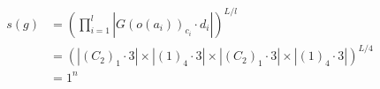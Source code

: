 \documentclass[preview]{standalone}
\begin{document}
\begin{align*}
s(g) &= \left(\prod_{i=1}^{l}\left|G(o(a_i))_{c_i}\cdot d_i\right|\right)^{L/l} \\   &= \left(\left|(C_2)_1\cdot 3\right| \times \left|(1)_4\cdot 3\right|\times \left|(C_2)_1\cdot 3\right| \times \left|(1)_4\cdot 3\right|\right)^{L/4} \\   &= 1^{n}
\end{align*}
\end{document}
